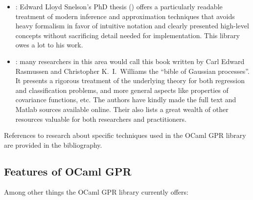 \documentclass[10pt]{article}
\begin{document}
\begin{itemize}

\item
\emph{}: Edward
Lloyd Snelson's PhD thesis (\cite{SnelsonThesis}) offers a particularly
readable treatment of modern inference and approximation techniques
that avoids heavy formalism in favor of intuitive notation and
clearly presented high-level concepts without sacrificing detail
needed for implementation.  This library owes a lot to his work.

\item \emph{}: many researchers in this area
would call this book written by Carl Edward Rasmussen and Christopher
K.\ I.\  Williams the ``bible of Gaussian processes''.  It presents
a rigorous treatment of the underlying theory for both regression
and classification problems, and more general aspects like properties
of covariance functions, etc.  The authors have kindly made the
full text and Matlab sources available online.  Their
also lists a great wealth of other resources valuable for both
researchers and practitioners.

\end{itemize}

References to research about specific techniques used in the OCaml
GPR library are provided in the bibliography.

\subsection{Features of OCaml GPR}

Among other things the OCaml GPR library currently offers:
\end{document}
